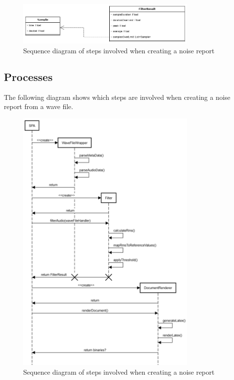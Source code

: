 \begin{figure}[H]
    \centering
    \includegraphics[width=0.8\textwidth]{../assets/interface.png}
    \caption{Sequence diagram of steps involved when creating a noise report}
\end{figure}

\subsection{Processes}
The following diagram shows which steps are involved when creating a noise report from a wave file.

\begin{figure}[H]
    \centering
    \includegraphics[width=0.8\textwidth]{../assets/sequence_diagram_from_wave_file_to_pdf.png}
    \caption{Sequence diagram of steps involved when creating a noise report}
\end{figure}

